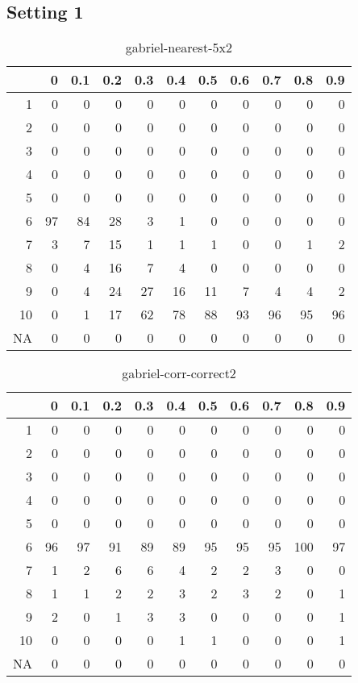 \documentclass[11pt]{article}
\begin{document}
\subsection*{Setting 1}
\begin{table}[H]
\centering
\begin{tabular}{rrrrrrrrrrr}
  \hline
 & 0 & 0.1 & 0.2 & 0.3 & 0.4 & 0.5 & 0.6 & 0.7 & 0.8 & 0.9 \\ 
  \hline
1 & 0 & 0 & 0 & 0 & 0 & 0 & 0 & 0 & 0 & 0 \\ 
  2 & 0 & 0 & 0 & 0 & 0 & 0 & 0 & 0 & 0 & 0 \\ 
  3 & 0 & 0 & 0 & 0 & 0 & 0 & 0 & 0 & 0 & 0 \\ 
  4 & 0 & 0 & 0 & 0 & 0 & 0 & 0 & 0 & 0 & 0 \\ 
  5 & 0 & 0 & 0 & 0 & 0 & 0 & 0 & 0 & 0 & 0 \\ 
  6 & 97 & 84 & 28 & 3 & 1 & 0 & 0 & 0 & 0 & 0 \\ 
  7 & 3 & 7 & 15 & 1 & 1 & 1 & 0 & 0 & 1 & 2 \\ 
  8 & 0 & 4 & 16 & 7 & 4 & 0 & 0 & 0 & 0 & 0 \\ 
  9 & 0 & 4 & 24 & 27 & 16 & 11 & 7 & 4 & 4 & 2 \\ 
  10 & 0 & 1 & 17 & 62 & 78 & 88 & 93 & 96 & 95 & 96 \\ 
  NA & 0 & 0 & 0 & 0 & 0 & 0 & 0 & 0 & 0 & 0 \\ 
   \hline
\end{tabular}
\caption{gabriel-nearest-5x2} 
\end{table}
\begin{table}[H]
\centering
\begin{tabular}{rrrrrrrrrrr}
  \hline
 & 0 & 0.1 & 0.2 & 0.3 & 0.4 & 0.5 & 0.6 & 0.7 & 0.8 & 0.9 \\ 
  \hline
1 & 0 & 0 & 0 & 0 & 0 & 0 & 0 & 0 & 0 & 0 \\ 
  2 & 0 & 0 & 0 & 0 & 0 & 0 & 0 & 0 & 0 & 0 \\ 
  3 & 0 & 0 & 0 & 0 & 0 & 0 & 0 & 0 & 0 & 0 \\ 
  4 & 0 & 0 & 0 & 0 & 0 & 0 & 0 & 0 & 0 & 0 \\ 
  5 & 0 & 0 & 0 & 0 & 0 & 0 & 0 & 0 & 0 & 0 \\ 
  6 & 96 & 97 & 91 & 89 & 89 & 95 & 95 & 95 & 100 & 97 \\ 
  7 & 1 & 2 & 6 & 6 & 4 & 2 & 2 & 3 & 0 & 0 \\ 
  8 & 1 & 1 & 2 & 2 & 3 & 2 & 3 & 2 & 0 & 1 \\ 
  9 & 2 & 0 & 1 & 3 & 3 & 0 & 0 & 0 & 0 & 1 \\ 
  10 & 0 & 0 & 0 & 0 & 1 & 1 & 0 & 0 & 0 & 1 \\ 
  NA & 0 & 0 & 0 & 0 & 0 & 0 & 0 & 0 & 0 & 0 \\ 
   \hline
\end{tabular}
\caption{gabriel-corr-correct2} 
\end{table}
\end{document}
